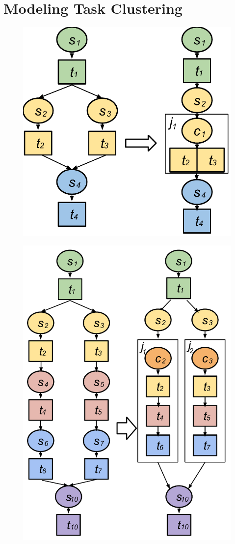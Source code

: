 \section{Modeling Task Clustering}
\label{sec:task_clustering}

\begin{figure}[h!]
\centering
 \includegraphics[width=0.5\linewidth]{figures/introduction/hc.pdf}
  \label{fig:intro_hc}
\end{figure}


\begin{figure}[!htb]
\centering
 \includegraphics[width=0.5\linewidth]{figures/model/vc.pdf}
  \label{fig:model_vc}
\end{figure}


